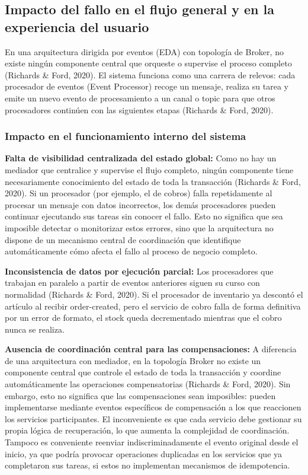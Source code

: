\documentclass[12pt, a4paper]{article}
\begin{document}
    \subsection{Impacto del fallo en el flujo general y en la experiencia del usuario}
En una arquitectura dirigida por eventos (EDA) con topología de Broker, no existe ningún componente central que orqueste o supervise el proceso completo (Richards \& Ford, 2020). El sistema funciona como una carrera de relevos: cada procesador de eventos (Event Processor) recoge un mensaje, realiza su tarea y emite un nuevo evento de procesamiento a un canal o topic para que otros procesadores continúen con las siguientes etapas (Richards \& Ford, 2020).
    \subsubsection{Impacto en el funcionamiento interno del sistema}
    \textbf{Falta de visibilidad centralizada del estado global:} Como no hay un mediador que centralice y supervise el flujo completo, ningún componente tiene necesariamente conocimiento del estado de toda la transacción (Richards \& Ford, 2020). Si un procesador (por ejemplo, el de cobros) falla repetidamente al procesar un mensaje con datos incorrectos, los demás procesadores pueden continuar ejecutando sus tareas sin conocer el fallo. Esto no significa que sea imposible detectar o monitorizar estos errores, sino que la arquitectura no dispone de un mecanismo central de coordinación que identifique automáticamente cómo afecta el fallo al proceso de negocio completo.

    \textbf{Inconsistencia de datos por ejecución parcial:} Los procesadores que trabajan en paralelo a partir de eventos anteriores siguen su curso con normalidad (Richards \& Ford, 2020). Si el procesador de inventario ya descontó el artículo al recibir order-created, pero el servicio de cobro falla de forma definitiva por un error de formato, el stock queda decrementado mientras que el cobro nunca se realiza.

    \textbf{Ausencia de coordinación central para las compensaciones:} A diferencia de una arquitectura con mediador, en la topología Broker no existe un componente central que controle el estado de toda la transacción y coordine automáticamente las operaciones compensatorias (Richards \& Ford, 2020). Sin embargo, esto no significa que las compensaciones sean imposibles: pueden implementarse mediante eventos específicos de compensación a los que reaccionen los servicios participantes. El inconveniente es que cada servicio debe gestionar su propia lógica de recuperación, lo que aumenta la complejidad de coordinación. Tampoco es conveniente reenviar indiscriminadamente el evento original desde el inicio, ya que podría provocar operaciones duplicadas en los servicios que ya completaron sus tareas, si estos no implementan mecanismos de idempotencia.
\end{document}
